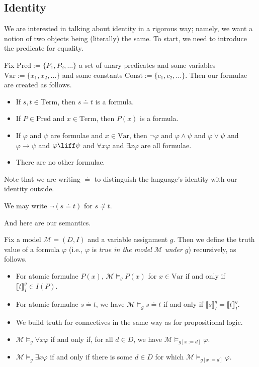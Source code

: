 \subsection{Identity}
We are interested in talking about identity in a rigorous way; namely, we want a notion of two objects being (literally) the same. To start, we need to introduce the predicate for equality.
\begin{defihelper}
	Fix $\mathrm{Pred}:=\{P_1,P_2,\ldots\}$ a set of unary predicates and some variables $\mathrm{Var}:=\{x_1,x_2,\ldots\}$ and some constants $\mathrm{Const}:=\{c_1,c_2,\ldots\}$. Then our formulae are created as follows.
	\begin{itemize}
		\item If $s,t\in\mathrm{Term}$, then $s\doteq t$ is a formula.
		\item If $P\in\mathrm{Pred}$ and $x\in\mathrm{Term}$, then $P(x)$ is a formula.
		\item If $\varphi$ and $\psi$ are formulae and $x\in\mathrm{Var}$, then $\lnot\varphi$ and $\varphi\land\psi$ and $\varphi\lor\psi$ and $\varphi\to\psi$ and $\varphi\liff\psi$ and $\forall x\varphi$ and $\exists x\varphi$ are all formulae.
		\item There are no other formulae.
	\end{itemize}
\end{defihelper}
Note that we are writing $\doteq $ to distinguish the language's identity with our identity outside.
\begin{notation}
	We may write $\lnot(s\doteq t)$ for $s\not\doteq t$.
\end{notation}
And here are our semantics.
\begin{defihelper}[Truth]
	Fix a model $\mathcal M=(D,I)$ and a variable assignment $g$. Then we define the truth value of a formula $\varphi$ (i.e., $\varphi$ is \textit{true in the model $\mathcal M$ under $g$}) recursively, as follows.
	\begin{itemize}
		\item For atomic formulae $P(x)$, $\mathcal M\models_gP(x)$ for $x\in\mathrm{Var}$ if and only if $\llbracket t\rrbracket_I^g\in I(P)$.
		\item For atomic formulae $s\doteq t$, we have $\mathcal M\models_gs\doteq t$ if and only if $\llbracket s\rrbracket_I^g=\llbracket t\rrbracket_I^g$.
		\item We build truth for connectives in the same way as for propositional logic.
		\item $\mathcal M\models_g\forall x\varphi$ if and only if, for all $d\in D$, we have $\mathcal M\models_{g[x:=d]}\varphi$.
		\item $\mathcal M\models_g\exists x\varphi$ if and only if there is some $d\in D$ for which $\mathcal M\models_{g[x:=d]}\varphi$.
	\end{itemize}
\end{defihelper}

